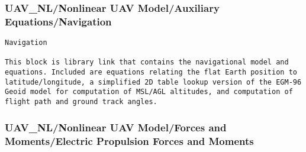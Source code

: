 \documentclass[12pt]{article}
\begin{document}
\subsubsection{UAV\_NL/Nonlinear UAV Model/Auxiliary Equations/Navigation}
\begin{verbatim}
Navigation

This block is library link that contains the navigational model and
equations. Included are equations relating the flat Earth position to
latitude/longitude, a simplified 2D table lookup version of the EGM-96
Geoid model for computation of MSL/AGL altitudes, and computation of
flight path and ground track angles. 

\end{verbatim}

\subsubsection{UAV\_NL/Nonlinear UAV Model/Forces and Moments/Electric Propulsion Forces and Moments}
\end{document}
